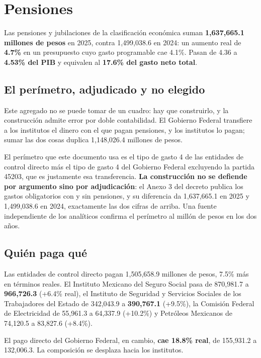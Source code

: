 \chapter{Pensiones}

Las pensiones y jubilaciones de la clasificación económica suman
\textbf{1,637,665.1 millones de pesos} en 2025, contra 1,499,038.6 en 2024: un
aumento real de \textbf{4.7\%} en un presupuesto cuyo gasto programable cae 4.1\%.
Pasan de 4.36 a \textbf{4.53\% del PIB} y equivalen al \textbf{17.6\% del gasto
neto total}.

\section{El perímetro, adjudicado y no elegido}

Este agregado no se puede tomar de un cuadro: hay que construirlo, y la
construcción admite error por doble contabilidad. El Gobierno Federal transfiere
a los institutos el dinero con el que pagan pensiones, y los institutos lo pagan;
sumar las dos cosas duplica 1,148,026.4 millones de pesos.

El perímetro que este documento usa es el tipo de gasto 4 de las entidades de
control directo más el tipo de gasto 4 del Gobierno Federal excluyendo la partida
45203, que es justamente esa transferencia. \textbf{La construcción no se defiende
por argumento sino por adjudicación}: el Anexo 3 del decreto publica los gastos
obligatorios con y sin pensiones, y su diferencia da 1,637,665.1 en 2025 y
1,499,038.6 en 2024, exactamente las dos cifras de arriba. Una fuente
independiente de los analíticos confirma el perímetro al millón de pesos en los
dos años.



\section{Quién paga qué}

Las entidades de control directo pagan 1,505,658.9 millones de pesos, 7.5\% más en
términos reales. El Instituto Mexicano del Seguro Social pasa de 870,981.7 a
\textbf{966,726.3} (+6.4\% real), el Instituto de Seguridad y Servicios Sociales
de los Trabajadores del Estado de 342,043.9 a \textbf{390,767.1} (+9.5\%), la
Comisión Federal de Electricidad de 55,961.3 a 64,337.9 (+10.2\%) y Petróleos
Mexicanos de 74,120.5 a 83,827.6 (+8.4\%).

El pago directo del Gobierno Federal, en cambio, \textbf{cae 18.8\% real}, de
155,931.2 a 132,006.3. La composición se desplaza hacia los institutos.

